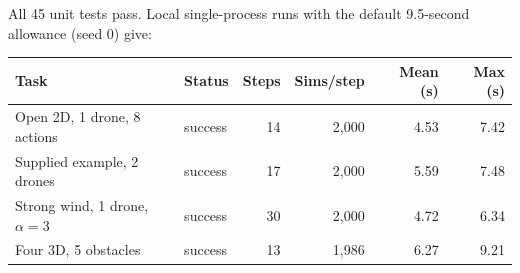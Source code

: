 All 45 unit tests pass. Local single-process runs with the
default 9.5-second allowance (seed 0) give:

\begin{table}[H]
\centering\small
\renewcommand{\arraystretch}{1.13}
\begin{tabular*}{\linewidth}{@{\extracolsep{\fill}}llrrrr@{}}
\toprule
Task & Status & Steps & Sims/step & Mean (s) & Max (s) \\
\midrule
Open 2D, 1 drone, 8 actions & success & 14 & 2,000 & 4.53 & 7.42 \\
Supplied example, 2 drones & success & 17 & 2,000 & 5.59 & 7.48 \\
Strong wind, 1 drone, $\alpha=3$ & success & 30 & 2,000 & 4.72 & 6.34 \\
Four 3D, 5 obstacles & success & 13 & 1,986 & 6.27 & 9.21 \\
\bottomrule
\end{tabular*}
\end{table}
